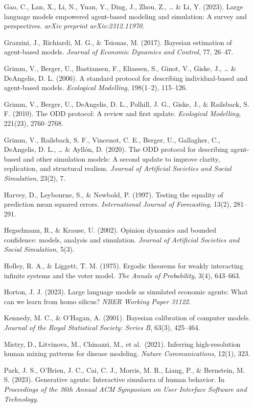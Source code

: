 \documentclass[
]{article}
\begin{document}
Gao, C., Lan, X., Li, N., Yuan, Y., Ding, J., Zhou, Z., \ldots{} \& Li,
Y. (2023). Large language models empowered agent-based modeling and
simulation: A survey and perspectives. \emph{arXiv preprint
arXiv:2312.11970}.

Grazzini, J., Richiardi, M. G., \& Tsionas, M. (2017). Bayesian
estimation of agent-based models. \emph{Journal of Economic Dynamics and
Control}, 77, 26--47.

Grimm, V., Berger, U., Bastiansen, F., Eliassen, S., Ginot, V., Giske,
J., \ldots{} \& DeAngelis, D. L. (2006). A standard protocol for
describing individual-based and agent-based models. \emph{Ecological
Modelling}, 198(1--2), 115--126.

Grimm, V., Berger, U., DeAngelis, D. L., Polhill, J. G., Giske, J., \&
Railsback, S. F. (2010). The ODD protocol: A review and first update.
\emph{Ecological Modelling}, 221(23), 2760--2768.

Grimm, V., Railsback, S. F., Vincenot, C. E., Berger, U., Gallagher, C.,
DeAngelis, D. L., \ldots{} \& Ayllón, D. (2020). The ODD protocol for
describing agent-based and other simulation models: A second update to
improve clarity, replication, and structural realism. \emph{Journal of
Artificial Societies and Social Simulation}, 23(2), 7.

Harvey, D., Leybourne, S., \& Newbold, P. (1997). Testing the equality
of prediction mean squared errors. \emph{International Journal of
Forecasting}, 13(2), 281--291.

Hegselmann, R., \& Krause, U. (2002). Opinion dynamics and bounded
confidence: models, analysis and simulation. \emph{Journal of Artificial
Societies and Social Simulation}, 5(3).

Holley, R. A., \& Liggett, T. M. (1975). Ergodic theorems for weakly
interacting infinite systems and the voter model. \emph{The Annals of
Probability}, 3(4), 643--663.

Horton, J. J. (2023). Large language models as simulated economic
agents: What can we learn from homo silicus? \emph{NBER Working Paper
31122}.

Kennedy, M. C., \& O'Hagan, A. (2001). Bayesian calibration of computer
models. \emph{Journal of the Royal Statistical Society: Series B},
63(3), 425--464.

Mistry, D., Litvinova, M., Chinazzi, M., et al.~(2021). Inferring
high-resolution human mixing patterns for disease modeling. \emph{Nature
Communications}, 12(1), 323.

Park, J. S., O'Brien, J. C., Cai, C. J., Morris, M. R., Liang, P., \&
Bernstein, M. S. (2023). Generative agents: Interactive simulacra of
human behavior. In \emph{Proceedings of the 36th Annual ACM Symposium on
User Interface Software and Technology}.
\end{document}
